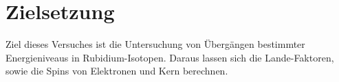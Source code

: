 \section{Zielsetzung}
\label{sec:zielsetzung}

Ziel dieses Versuches ist die Untersuchung von Übergängen bestimmter Energieniveaus in Rubidium-Isotopen. Daraus lassen sich die Lande-Faktoren, sowie die Spins von Elektronen und Kern berechnen.
